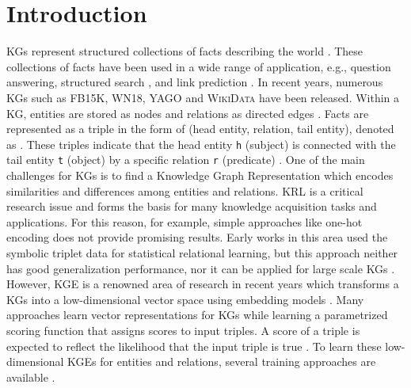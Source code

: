 \chapter{Introduction}
\label{ch:introduction}

\acp{KG} represent structured collections of facts describing the world   \cite{hogan2020knowledge}.
These collections of facts have been used in a wide range of application, e.g., question answering, structured search \cite{zhang2019nscaching}, and link prediction \cite{cai2017kbgan, Alam2020AffinityDN}.
In recent years, numerous \acp{KG} such as \textsc{FB15K}, \textsc{WN18}, \textsc{YAGO} \cite{ConEx} and \textsc{WikiData} \cite{arnaoutwikinegata} have been released.
Within a \ac{KG}, entities are stored as nodes and relations as directed edges \cite{zhang2019nscaching}.
Facts are represented as a triple in the form of (head entity, relation, tail entity), denoted as .
These triples indicate that the head entity \texttt{h} (subject) is connected with the tail entity \texttt{t} (object) by a specific relation \texttt{r} (predicate) \cite{zhang2019nscaching, Alam2020AffinityDN}.
One of the main challenges for \acp{KG} is to find a Knowledge Graph Representation which encodes similarities and differences among  entities and relations. 
\ac{KRL} is a critical research issue and forms the basis for many knowledge acquisition tasks and applications.
For this reason, for example, simple approaches like one-hot encoding does not provide promising results.
Early works in this area used the symbolic triplet data for statistical relational learning, but this approach neither has good generalization performance, nor it can be applied for large scale \acp{KG} \cite{zhang2021efficient}.
However, \ac{KGE} is a renowned area of research in recent years which transforms a \acp{KG} into a low-dimensional vector space using embedding models \cite{Alam2020AffinityDN}.
Many approaches learn vector representations for \acp{KG} while learning a parametrized scoring function that assigns scores to input triples.
A score of a triple is expected to reflect the likelihood that the input triple is true \cite{ConvE, qiannegative}.
To learn these low-dimensional \acp{KGE} for entities and relations, several training approaches are available \cite{Ruffinelli2020You}.
